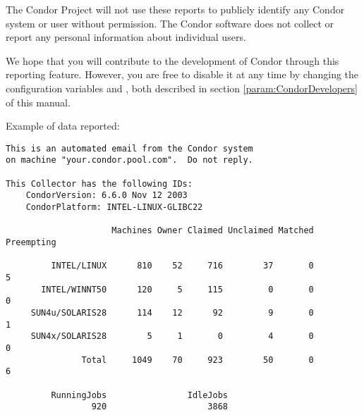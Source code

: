 The Condor Project will not use these reports to publicly
identify any Condor system or user without permission.
The Condor software does not collect or report any personal
information about individual users.

We hope that you will contribute to the development of Condor
through this reporting feature.
However, you are free to disable it at any time by
changing the configuration variables 
and ,
both described in section \ref{param:CondorDevelopers} of this manual.

Example of data reported:

\begin{verbatim}
This is an automated email from the Condor system
on machine "your.condor.pool.com".  Do not reply.

This Collector has the following IDs:
    CondorVersion: 6.6.0 Nov 12 2003
    CondorPlatform: INTEL-LINUX-GLIBC22

                     Machines Owner Claimed Unclaimed Matched Preempting

         INTEL/LINUX      810    52     716        37       0          5
       INTEL/WINNT50      120     5     115         0       0          0
     SUN4u/SOLARIS28      114    12      92         9       0          1
     SUN4x/SOLARIS28        5     1       0         4       0          0
               Total     1049    70     923        50       0          6

         RunningJobs                IdleJobs
                 920                    3868
\end{verbatim}



